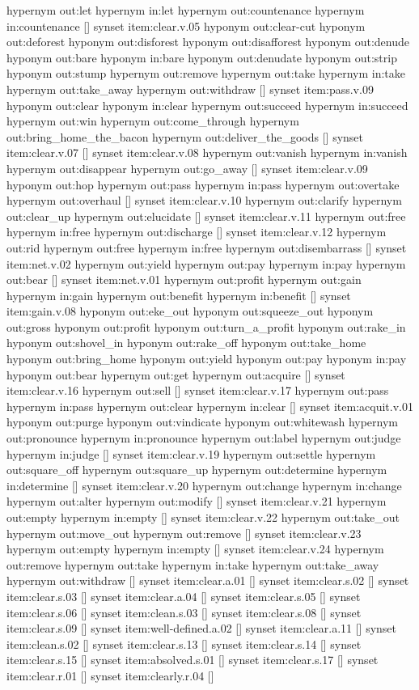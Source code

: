 {\begin{draft}
hypernym out:let
hypernym in:let
hypernym out:countenance
hypernym in:countenance
[]
synset item:clear.v.05
hyponym out:clear-cut
hyponym out:deforest
hyponym out:disforest
hyponym out:disafforest
hyponym out:denude
hyponym out:bare
hyponym in:bare
hyponym out:denudate
hyponym out:strip
hyponym out:stump
hypernym out:remove
hypernym out:take
hypernym in:take
hypernym out:take\_away
hypernym out:withdraw
[]
synset item:pass.v.09
hyponym out:clear
hyponym in:clear
hypernym out:succeed
hypernym in:succeed
hypernym out:win
hypernym out:come\_through
hypernym out:bring\_home\_the\_bacon
hypernym out:deliver\_the\_goods
[]
synset item:clear.v.07
[]
synset item:clear.v.08
hypernym out:vanish
hypernym in:vanish
hypernym out:disappear
hypernym out:go\_away
[]
synset item:clear.v.09
hyponym out:hop
hypernym out:pass
hypernym in:pass
hypernym out:overtake
hypernym out:overhaul
[]
synset item:clear.v.10
hypernym out:clarify
hypernym out:clear\_up
hypernym out:elucidate
[]
synset item:clear.v.11
hypernym out:free
hypernym in:free
hypernym out:discharge
[]
synset item:clear.v.12
hypernym out:rid
hypernym out:free
hypernym in:free
hypernym out:disembarrass
[]
synset item:net.v.02
hypernym out:yield
hypernym out:pay
hypernym in:pay
hypernym out:bear
[]
synset item:net.v.01
hypernym out:profit
hypernym out:gain
hypernym in:gain
hypernym out:benefit
hypernym in:benefit
[]
synset item:gain.v.08
hyponym out:eke\_out
hyponym out:squeeze\_out
hyponym out:gross
hyponym out:profit
hyponym out:turn\_a\_profit
hyponym out:rake\_in
hyponym out:shovel\_in
hyponym out:rake\_off
hyponym out:take\_home
hyponym out:bring\_home
hyponym out:yield
hyponym out:pay
hyponym in:pay
hyponym out:bear
hypernym out:get
hypernym out:acquire
[]
synset item:clear.v.16
hypernym out:sell
[]
synset item:clear.v.17
hypernym out:pass
hypernym in:pass
hypernym out:clear
hypernym in:clear
[]
synset item:acquit.v.01
hyponym out:purge
hyponym out:vindicate
hyponym out:whitewash
hypernym out:pronounce
hypernym in:pronounce
hypernym out:label
hypernym out:judge
hypernym in:judge
[]
synset item:clear.v.19
hypernym out:settle
hypernym out:square\_off
hypernym out:square\_up
hypernym out:determine
hypernym in:determine
[]
synset item:clear.v.20
hypernym out:change
hypernym in:change
hypernym out:alter
hypernym out:modify
[]
synset item:clear.v.21
hypernym out:empty
hypernym in:empty
[]
synset item:clear.v.22
hypernym out:take\_out
hypernym out:move\_out
hypernym out:remove
[]
synset item:clear.v.23
hypernym out:empty
hypernym in:empty
[]
synset item:clear.v.24
hypernym out:remove
hypernym out:take
hypernym in:take
hypernym out:take\_away
hypernym out:withdraw
[]
synset item:clear.a.01
[]
synset item:clear.s.02
[]
synset item:clear.s.03
[]
synset item:clear.a.04
[]
synset item:clear.s.05
[]
synset item:clear.s.06
[]
synset item:clean.s.03
[]
synset item:clear.s.08
[]
synset item:clear.s.09
[]
synset item:well-defined.a.02
[]
synset item:clear.a.11
[]
synset item:clean.s.02
[]
synset item:clear.s.13
[]
synset item:clear.s.14
[]
synset item:clear.s.15
[]
synset item:absolved.s.01
[]
synset item:clear.s.17
[]
synset item:clear.r.01
[]
synset item:clearly.r.04
[]
\end{draft}


}
